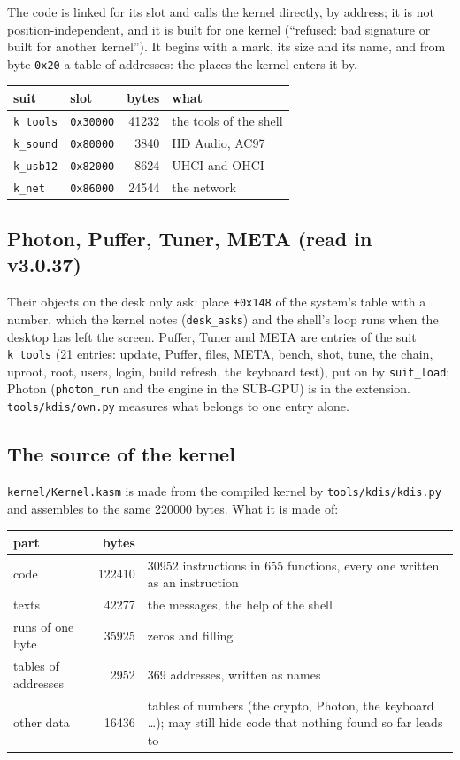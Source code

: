 \documentclass[11pt,a4paper]{article}
\newcommand{\file}[1]{\texttt{#1}}
\begin{document}
\noindent The code is linked for its slot and calls the kernel directly, by address; it is not
position-independent, and it is built for one kernel (``refused: bad signature or built for
another kernel''). It begins with a mark, its size and its name, and from byte \texttt{0x20} a
table of addresses: the places the kernel enters it by.

\begin{longtable}{@{}l l r l@{}}
\toprule
suit & slot & bytes & what \\ \midrule
\texttt{k\_tools} & \texttt{0x30000} & 41232 & the tools of the shell \\
\texttt{k\_sound} & \texttt{0x80000} & 3840 & HD Audio, AC97 \\
\texttt{k\_usb12} & \texttt{0x82000} & 8624 & UHCI and OHCI \\
\texttt{k\_net} & \texttt{0x86000} & 24544 & the network \\
\bottomrule
\end{longtable}

\subsection{Photon, Puffer, Tuner, META (read in v3.0.37)}

Their objects on the desk only ask: place \texttt{+0x148} of the system's table with a number,
which the kernel notes (\texttt{desk\_asks}) and the shell's loop runs when the desktop has
left the screen. Puffer, Tuner and META are entries of the suit \texttt{k\_tools} (21 entries:
update, Puffer, files, META, bench, shot, tune, the chain, uproot, root, users, login, build
refresh, the keyboard test), put on by \texttt{suit\_load}; Photon (\texttt{photon\_run} and the
engine in the SUB-GPU) is in the extension. \file{tools/kdis/own.py} measures what belongs to
one entry alone.

\subsection{The source of the kernel}

\file{kernel/Kernel.kasm} is made from the compiled kernel by \file{tools/kdis/kdis.py} and
assembles to the same 220000 bytes. What it is made of:

\begin{longtable}{@{}l r p{9.5cm}@{}}
\toprule
part & bytes & \\ \midrule
code & 122410 & 30952 instructions in 655 functions, every one written as an instruction \\
texts & 42277 & the messages, the help of the shell \\
runs of one byte & 35925 & zeros and filling \\
tables of addresses & 2952 & 369 addresses, written as names \\
other data & 16436 & tables of numbers (the crypto, Photon, the keyboard \ldots); may still hide
                     code that nothing found so far leads to \\
\bottomrule
\end{longtable}
\end{document}
